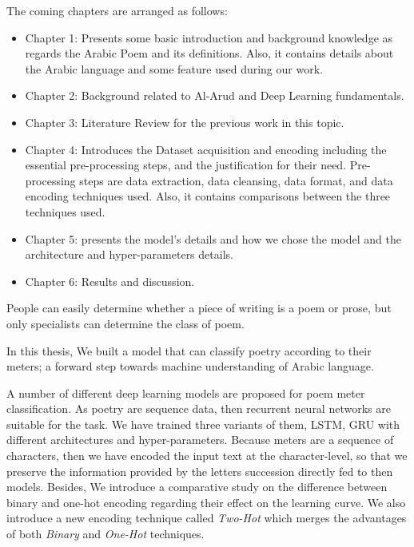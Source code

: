 


\begin{spacing}{1}\end{spacing}
The coming chapters are arranged as follows:
\begin{itemize}
	\item Chapter 1: Presents some basic introduction and background knowledge as regards the Arabic Poem and its definitions. Also, it contains details about the Arabic language and some feature used during our work.
  \item Chapter 2: Background related to Al-Arud and Deep Learning fundamentals. 
  \item Chapter 3: Literature Review for the previous work in this topic.    
  \item Chapter 4: Introduces the Dataset acquisition and encoding including the essential pre-processing steps, and the justification for their need. Pre-processing steps are data extraction, data cleansing, data format, and data encoding techniques used. Also, it contains comparisons between the three techniques used.
  \item Chapter 5: presents the model's details and how we chose the model and the architecture and hyper-parameters details.
  \item Chapter 6: Results and discussion.
\end{itemize}


 




\begin{spacing}{1}\end{spacing}


People can easily determine whether a piece of writing is a poem or prose, but only specialists can determine the class of poem.

In this thesis, We built a model that can classify poetry according to their meters; a forward step towards machine understanding of Arabic language.

A number of different deep learning models are proposed for poem meter classification. As poetry are sequence data, then recurrent neural networks are suitable for the task. We have trained three variants of them, LSTM, GRU with different architectures and hyper-parameters. Because meters are a sequence of characters, then we have encoded the input text at the character-level, so that we preserve the information provided by the letters succession directly fed to then models. Besides, We introduce a comparative study on the difference between binary and one-hot encoding regarding their effect on the learning curve. We also introduce a new encoding technique called \textit{Two-Hot} which merges the advantages of both \textit{Binary} and \textit{One-Hot} techniques.


